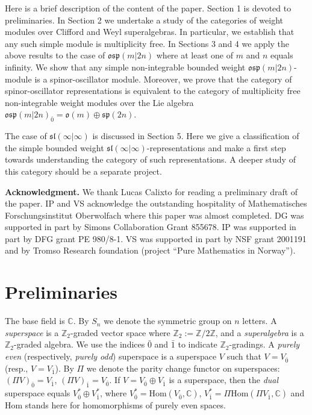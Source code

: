 \documentclass[12pt]{amsart}
\theoremstyle{plain} %
\numberwithin{equation}{section}
\theoremstyle{definition}
\theoremstyle{remark}
\theoremstyle{plain} %
\renewcommand{\sp}{\mathfrak{sp}}
\renewcommand{\sl}{\mathfrak{sl}}
\newcommand{\osp}{\mathfrak{osp}}
\newcommand{\Hom}{\mathrm{Hom}}
\newcommand{\C}{\mathbb{C}}
\def\go{\mathfrak{o}}
\begin{document}
Here is a brief description of the content of the paper. Section 1 is devoted to preliminaries. In Section 2 we undertake a study of the categories of weight modules over Clifford and Weyl  superalgebras. In particular, we establish that any such simple  module is multiplicity free.  In Sections 3 and 4 we apply the above results to the case of $\osp (m|2n)$  where at least one of $m$ and $n$ equals infinity. We show that any simple non-integrable bounded weight  $\osp (m|2n)$-module is a spinor-oscillator module. Moreover, we prove that the category of spinor-oscillator representations is equivalent to the category of multiplicity free non-integrable weight modules over the Lie algebra  $\osp (m|2n)_{\bar{0}} = \go (m) \oplus \sp (2n)$.


The case of $\sl (\infty |\infty)$ is discussed in Section 5.  Here we give a classification of the simple bounded weight $\sl (\infty |\infty)$-representations and make a first step towards  understanding  the category of such representations. A deeper study of this category should be a separate project. 


\medskip
{\bf Acknowledgment.} We thank Lucas Calixto for reading a preliminary draft of the paper. IP and VS acknowledge the outstanding hospitality of Mathematisches Forschungsinstitut Oberwolfach where this paper was almost completed.
DG was supported in part by Simons Collaboration Grant 855678. IP was supported in part by DFG grant PE 980/8-1.  VS was supported in part by
NSF grant 2001191 and by Tromso Research foundation (project ``Pure Mathematics in Norway'').
   \section{Preliminaries}\label{prelim}
   
   The base field is $\C$. By $S_n$ we denote the symmetric group on $n$ letters. A \emph{superspace} is a $\mathbb Z_2$-graded vector space where $\mathbb Z_2 := \mathbb Z/2\mathbb Z$, and a \emph{superalgebra} is a $\mathbb Z_2$-graded algebra. We use the indices $\bar{0}$ and $\bar{1}$ 
  to indicate $\mathbb Z_2$-gradings.  
  A \emph{purely even}  (respectively, \emph{purely odd}) superspace is a superspace $V$ such that   $V = V_{\bar{0}}$ (resp., $V = V_{\bar{1}}$). By $\Pi$ we denote the parity change functor on  superspaces:  $(\Pi V)_{\bar{0}} = V_{\bar{1}} $, $(\Pi V)_{\bar{1}} = V_{\bar{0}}$. If $V = V_{\bar{0}} \oplus  V_{\bar{1}}$ is a superspace, then the \emph{dual} superspace equals $V_{\bar{0}}^* \oplus  V_{\bar{1}}^*$, where  $V_{\bar{0}}^* = \Hom (V_{\bar{0}}, \mathbb C)$, $V_{\bar{1}}^* = \Pi \Hom (\Pi V_{\bar{1}}, \mathbb C)$ and $\Hom$ stands here for homomorphisms of purely even spaces.
\end{document}

